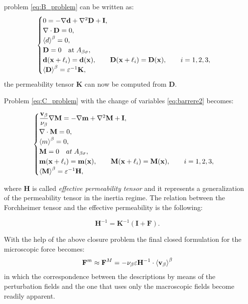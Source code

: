 \noindent problem \eqref{eq:B_problem} can be written as:
\begin{eqnarray}
	\begin{cases}
		0 = -\nabla \mathbf{d} + \nabla^2 \mathbf{D} +\mathbf{I},\\
		\nabla \cdot \mathbf{D} = 0,  \\
		{\left< d \right>}^{\beta} =0, \\
		\mathbf{D} = 0 \quad \textrm{at} \; A_{\beta \sigma} ,\\
		\mathbf{d}(\mathbf{x} +\ell_i) = \mathbf{d}(\mathbf{x}), \qquad \mathbf{D}(\mathbf{x} +\ell_i) = \mathbf{D}(\mathbf{x}), \qquad i=1,2,3 ,\\
		{\left< \mathbf{D} \right>}^{\beta} = \varepsilon^{-1} \mathbf{K},
	\end{cases}
\label{eq:D_problem}
\end{eqnarray}
the permeability tensor $\mathbf{K}$ can now be computed from $\mathbf{D}$.

\newpage 
\noindent Problem \eqref{eq:C_problem} with the change of variables \eqref{eq:barrere2} becomes:

\begin{eqnarray}
	\begin{cases}
		\dfrac{\textbf{v}_{\beta}}{\nu_{\beta}} \nabla \mathbf{M} = -\nabla \mathbf{m} + \nabla^2 \mathbf{M} +\mathbf{I},\\
		\nabla \cdot \mathbf{M} = 0,  \\
		{\left< m \right>}^{\beta} =0, \\
		\mathbf{M} = 0 \quad at \; A_{\beta \sigma}, \\
		\mathbf{m}(\mathbf{x} +\ell_i) = \mathbf{m}(\mathbf{x}), \qquad \mathbf{M}(\mathbf{x} +\ell_i) = \mathbf{M}(\mathbf{x}), \qquad i=1,2,3 ,\\
		{\left< \mathbf{M} \right>}^{\beta} = \varepsilon^{-1} \mathbf{H},
	\end{cases}
\label{eq:M_problem}
\end{eqnarray}

\noindent where $\mathbf{H}$ is called \textit{effective permeability tensor} and it represents a generalization of the permeability tensor in the inertia regime.
The relation between the Forchheimer tensor and the effective permeability is the following:

$$
\mathbf{H}^{-1} = \mathbf{K}^{-1} \left(\mathbf{I} +\mathbf{F}\right).
$$

With the help of the above closure problem the final closed formulation for the microscopic force becomes:
\begin{equation}
\mathbf{F}^m \approx \mathbf{F}^M = - \nu_{\beta} \varepsilon \mathbf{H}^{-1} \cdot {\left< \textbf{v}_{\beta}\right>}^{\beta}
\label{eq:closure_final}
\end{equation}
in which the correspondence between the descriptions by means of the perturbation fields and the one that uses only the macroscopic fields become readily apparent.

